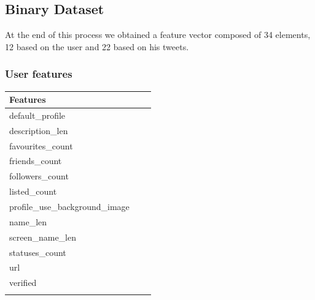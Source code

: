 \subsection{Binary Dataset}
At the end of this process we obtained a feature vector composed of 34 elements, 12 based on the user and 22 based on his tweets.

\subsubsection{User features}


\small
\begin{center}
	\begin{tabular}{lll}
		\textbf{Features}\\
		\hline\hline
		default\_profile\\
		description\_len\\
		favourites\_count\\
		friends\_count\\
		followers\_count\\
		listed\_count\\
		profile\_use\_background\_image\\
		name\_len\\
		screen\_name\_len\\
		statuses\_count\\
		url\\
		verified\\
		\hline\\
		
	\end{tabular}
\end{center}
\normalsize

